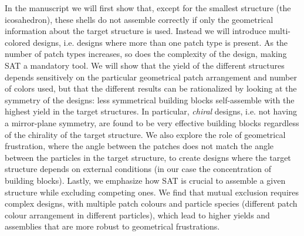 \documentclass[a4paper, amsfonts, amssymb, amsmath, reprint, showkeys, nofootinbib, oneside]{revtex4-1}
\begin{document}
In the manuscript we will first show that, except for the smallest structure (the icosahedron), these shells do not assemble correctly if only the geometrical information about the target structure is used. Instead we will introduce multi-colored designs, i.e. designs where more than one patch type is present. As the number of patch types increases, so does the complexity of the design, making SAT a mandatory tool. We will show that the yield of the different structures depends sensitively on the particular geometrical patch arrangement and number of colors used, but that the different results can be rationalized by looking at the symmetry of the designs: less symmetrical building blocks self-assemble with the highest yield in the target structures. In particular, \emph{chiral} designs, i.e. not having a mirror-plane symmetry, are found to be very effective building blocks regardless of the chirality of the target structure. We also explore the role of geometrical frustration, where the angle between the patches does not match the angle between the particles in the target structure, to create designs where the target structure depends on external conditions (in our case the concentration of building blocks). Lastly, we emphasize how SAT is crucial to assemble a given structure while excluding competing ones. We find that mutual exclusion requires complex designs, with multiple patch colours and particle species (different patch colour arrangement in different particles), which lead to higher yields and assemblies that are more robust to geometrical frustrations.

\end{document}
